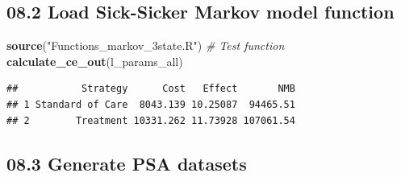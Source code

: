 \documentclass[
]{article}
\newenvironment{Shaded}{\begin{snugshade}}{\end{snugshade}}
\newcommand{\CommentTok}[1]{\textcolor[rgb]{0.56,0.35,0.01}{\textit{#1}}}
\newcommand{\KeywordTok}[1]{\textcolor[rgb]{0.13,0.29,0.53}{\textbf{#1}}}
\newcommand{\NormalTok}[1]{#1}
\newcommand{\StringTok}[1]{\textcolor[rgb]{0.31,0.60,0.02}{#1}}
\begin{document}
\hypertarget{load-sick-sicker-markov-model-function}{%
\subsection{08.2 Load Sick-Sicker Markov model
function}\label{load-sick-sicker-markov-model-function}}

\begin{Shaded}
\begin{Highlighting}[]
\KeywordTok{source}\NormalTok{(}\StringTok{"Functions_markov_3state.R"}\NormalTok{)}
\CommentTok{# Test function}
\KeywordTok{calculate_ce_out}\NormalTok{(l_params_all)}
\end{Highlighting}
\end{Shaded}

\begin{verbatim}
##           Strategy      Cost   Effect       NMB
## 1 Standard of Care  8043.139 10.25087  94465.51
## 2        Treatment 10331.262 11.73928 107061.54
\end{verbatim}

\hypertarget{generate-psa-datasets}{%
\subsection{08.3 Generate PSA datasets}\label{generate-psa-datasets}}
\end{document}
